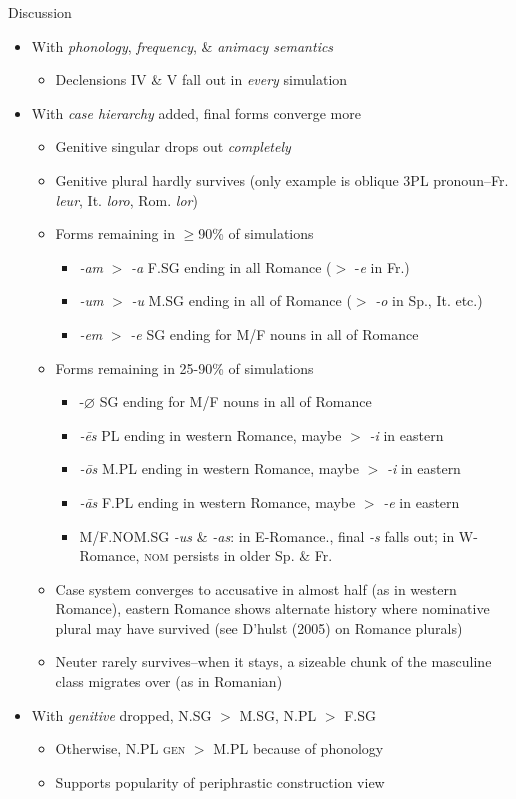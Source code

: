 \documentclass[final]{beamer}
\newlength{\onecolwid}
\newcommand{\bit}[0]{\begin{itemize}}
\newcommand{\eit}[0]{\end{itemize}}
\begin{document}
\begin{frame}[t]
\begin{columns}[t]
\begin{column}{\onecolwid}
\begin{alertblock}{Discussion}

\small
\bit
	\item With \textit{phonology}, \textit{frequency}, \& \textit{animacy semantics}
	\bit
		\item Declensions IV \& V fall out in \textit{every} simulation
	\eit
	\item With \textit{case hierarchy} added, final forms converge more
	\bit
		\item Genitive singular drops out \textit{completely}
		\item Genitive plural hardly survives (only example is oblique 3PL pronoun--Fr. \textit{leur}, It. \textit{loro}, Rom. \textit{lor})
		\item Forms remaining in $\geq$90\% of simulations
		\bit
			\item \textit{-am} $>$ \textit{-a} F.SG ending in all Romance ($>$ -\textit{e} in Fr.)
			\item \textit{-um} $>$ \textit{-u} M.SG ending in all of Romance ($>$ \textit{-o} in Sp., It. etc.)
			\item \textit{-em} $>$ \textit{-e} SG ending for M/F nouns in all of Romance
		\eit
		\item Forms remaining in 25-90\% of simulations
		\bit
			\item -$\varnothing$ SG ending for M/F nouns in all of Romance
			\item \textit{-\=es} PL ending in western Romance, maybe $>$ \textit{-i} in eastern
			\item \textit{-\=os} M.PL ending in western Romance, maybe $>$ \textit{-i} in eastern
			\item \textit{-\=as} F.PL ending in western Romance, maybe $>$ \textit{-e} in eastern
			\item M/F.NOM.SG \textit{-us} \& \textit{-as}: in E-Romance., final \textit{-s} falls out; in W-Romance, \textsc{nom} persists in older Sp. \& Fr.
		\eit
		\item Case system converges to accusative in almost half (as in western Romance), eastern Romance shows alternate history where nominative plural may have survived (see D'hulst (2005) on Romance plurals)
		\item Neuter rarely survives--when it stays, a sizeable chunk of the masculine class migrates over (as in Romanian)
	\eit
	\item With \textit{genitive} dropped, N.SG $>$ M.SG, N.PL $>$ F.SG
	\bit
		\item Otherwise, N.PL \textsc{gen} $>$ M.PL because of phonology
		\item Supports popularity of periphrastic construction view
	\eit
\eit


\end{alertblock}
\end{column}
\end{columns}
\end{frame}
\end{document}

